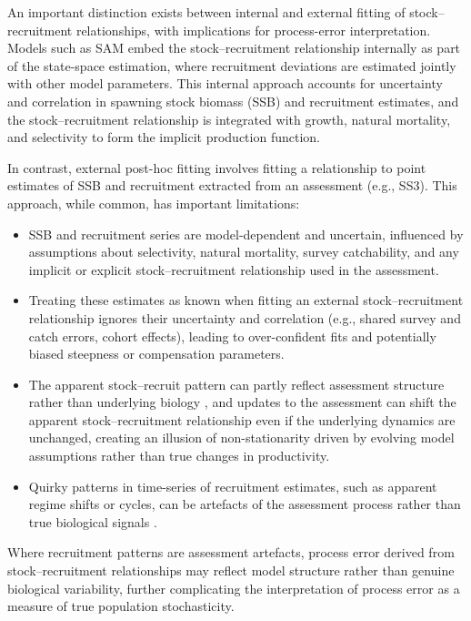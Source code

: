 \documentclass[11pt,a4paper]{article}
\begin{document}
An important distinction exists between internal and external fitting of stock--recruitment relationships, with implications for process-error interpretation. Models such as SAM \citep{nielsen2014sam} embed the stock--recruitment relationship internally as part of the state-space estimation, where recruitment deviations are estimated jointly with other model parameters. This internal approach accounts for uncertainty and correlation in spawning stock biomass (SSB) and recruitment estimates, and the stock--recruitment relationship is integrated with growth, natural mortality, and selectivity to form the implicit production function.

In contrast, external post-hoc fitting involves fitting a relationship to point estimates of SSB and recruitment extracted from an assessment (e.g., SS3). This approach, while common, has important limitations:

\begin{itemize}
  \item SSB and recruitment series are model-dependent and uncertain, influenced by assumptions about selectivity, natural mortality, survey catchability, and any implicit or explicit stock--recruitment relationship used in the assessment.
  \item Treating these estimates as known when fitting an external stock--recruitment relationship ignores their uncertainty and correlation (e.g., shared survey and catch errors, cohort effects), leading to over-confident fits and potentially biased steepness or compensation parameters.
  \item The apparent stock--recruit pattern can partly reflect assessment structure rather than underlying biology \citep{simmonds2019biological}, and updates to the assessment can shift the apparent stock--recruitment relationship even if the underlying dynamics are unchanged, creating an illusion of non-stationarity driven by evolving model assumptions rather than true changes in productivity.
  \item Quirky patterns in time-series of recruitment estimates, such as apparent regime shifts or cycles, can be artefacts of the assessment process rather than true biological signals \citep{dickeycollas2015quirky}.
\end{itemize}

Where recruitment patterns are assessment artefacts, process error derived from stock--recruitment relationships may reflect model structure rather than genuine biological variability, further complicating the interpretation of process error as a measure of true population stochasticity.
\end{document}
